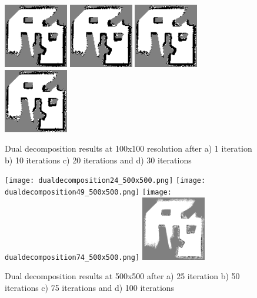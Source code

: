 \documentclass[10pt,oneside,letterpaper]{article}
\begin{document}
\begin{figure}
  \includegraphics[width=0.25\textwidth]{dualdecomposition0_100x100.png}%
  \includegraphics[width=0.25\textwidth]{dualdecomposition10_100x100.png}%
  \includegraphics[width=0.25\textwidth]{dualdecomposition20_100x100.png}%
  \includegraphics[width=0.25\textwidth]{dualdecomposition30_100x100.png}
  \caption{Dual decomposition results at 100x100 resolution after a) 1 iteration b) 10 iterations c) 20 iterations and d) 30 iterations}
  \label{fig:dualdecomposition}
\end{figure}

\begin{figure}
  \texttt{[image: dualdecomposition24\_500x500.png]}%
  \texttt{[image: dualdecomposition49\_500x500.png]}%
  \texttt{[image: dualdecomposition74\_500x500.png]}%
  \includegraphics[width=0.25\textwidth]{dualdecomposition99_500x500.png}
  \caption{Dual decomposition results at 500x500 after a) 25 iteration b) 50 iterations c) 75 iterations and d) 100 iterations}
  \label{fig:dualdecomposition500x500}
\end{figure}
\end{document}
